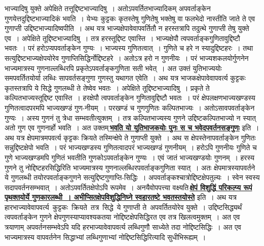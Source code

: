\documentclass[11pt, openany]{book}
\begin{document}
{{भाज्यादिषु युक्ते अपेक्षिते तत्तूद्दिष्टभाज्यादिषु~।
अतोऽपवर्तितभाज्यादिकम् अपवर्ताङ्केन गुणयेत्तदुद्दिष्टभाज्यादिकं भवति~। येभ्यः कुट्टकः कृतस्तेषु गुणितेषु भक्तेषु
वा फलभेदो नास्तीति जाते ते एव गुणाप्ती उद्दिष्टभाज्यादिष्वपीति~। अथ यत्र 
भाज्यक्षेपावेवापवर्तितौ न हरस्तत्रापि तदुत्थे गुणाप्ती तेषु युक्ते एव~।
अपेक्षिते तूद्दिष्टभाज्यादिषु~। तत्र हरस्तूद्दिष्ट एवास्ति~। भाज्यक्षेपौ
त्वपवर्ताङ्कगुणितावुद्दिष्टौ भवतः~। परं हरोऽप्यपवर्ताङ्केन गुण्यः~। भाज्यस्य
गुणितत्वात्~। 
गुणिते च हरे न स्यादुद्दिष्टहरः~। तथा सत्युद्दिष्टभाज्यक्षेपयोरेव
गुणाप्तिसिद्धिर्नोद्दिष्टहरे~। अतोऽत्र हरो न गुणनीयः~। परं भाज्यशकलयोर्गुणनेन
भाज्यमात्रस्य गुणनाल्लब्धिरपि प्रकृतेऽपवर्ताङ्कगुणिता सती भवेत्~। अत उक्तं
युतिभाज्ययोः समपवर्तितयोर्या लब्धिः सापवर्तसङ्गुणा गुणस्तु यथागत एवेति~।
अथ यत्र भाजकक्षेपावेवापवर्त्य कुट्टकः कृतस्तत्रापि ये सिद्धे गुणलब्धी ते तेष्वेव
भवतः~। 
अपेक्षिते तूद्दिष्टभाज्यादिषु~। प्रकृते ते कल्पितभाज्यस्तूद्दिष्ट
एवास्ति~। हरक्षेपौ 
त्वपवर्ताङ्केन गुणितावुद्दिष्टौ भवतः~। परं क्षेपलक्षणभाज्यखण्डस्य
गुणितत्वादपरमपि भाज्यखण्डं गुण-नीयम्~। परखण्डं च गुणगुणितः कल्पितभाज्यः~। 
अतोऽसावपवर्ताङ्केन गुण्यः~। अस्य गुणनं तु त्रेधा सम्भवतीत्युक्तम्~।
तत्र कल्पितभाज्यस्य गुणने उद्दिष्टकल्पितभाज्यो न स्यात् अतो गुण एव गुणनार्हो
भवति~। अत उक्तम्\textendash \,\hyperref[53]{\textbf{भवति यो युतिभाजकयोः पुनः स च भवेदपवर्तनसङ्गुणः}} इति~। अथ यत्र क्षेपमात्रमपवर्त्य कृट्टकः क्रियते तस्मिन्क्षेपे
ते गुणाप्ती युक्ते~। अथ स क्षेपस्तेनापवर्ताङ्केन गुणितः सन्नुद्दिष्टक्षेपो
भवति~।
\newpage
\noindent परं भाज्यखण्डस्य गुणितत्वादपरं भाज्यखण्डं गुणनीयम्~। हरोऽपि गुणनीयः 
गुणिते च गुणे भाज्यखण्डमपि गुणितं भवतीति गुणकोऽपवर्ताङ्केन गुण्यः~। 
एवं जातं भाज्यखण्डयोः गुणनम्~। हरस्य गुणने तु नोद्दिष्टहरसिद्धिरिति 
भाज्यमात्रस्य गुणनाल्लब्धिरपवर्ताङ्कगुणिता स्यात्~। अतः
क्षेपमात्रस्यापवर्तने ये गुणलब्धी तयोरपवर्ताङ्कगुणने सत्युद्दिष्टगुणाप्ति-सिद्धिः~।
अपवर्ताङ्कश्चात्रोद्दिष्टक्षेपतुल्यः~। स्वेन स्वस्य सदापवर्तनसम्भवात्~। अतोऽपवर्तितक्षेपोऽपि
रूपमेव~। अनयैवोपपत्त्या वक्ष्यति\textendash \,\hyperref[66]{\textbf{क्षेपं विशुद्धिं परिकल्प्य रूपं पृथक्तयोर्ये
गुणकारलब्धी~। अभीप्सितक्षेपविशुद्धिनिघ्ने स्वहारतष्टे भवतस्तयोस्ते}} इति~। अथ यत्र हारभाज्यावेवापवर्त्य \,कुट्टकः \,क्रियते \,तत्र \,सिद्धे \,ये गुणाप्ती ते \,अपवर्तितयोरेव युक्ते~। उद्दिष्टसिद्ध्यर्थं त्वपवर्ताङ्केन गुणने क्षेपगुणस्याप्यावश्यकतया
नोद्दिष्टक्षेपसिद्धिरत  एव तत्र खिलत्वमुक्तम्~। अत एव त्रयाणाम् अपवर्तनसम्भवेऽपि यदि हरभाज्यावेवापवर्त्य लब्धिगुणौ साध्येते तदा नोद्दिष्टसिद्धिः~। अत एव भाज्यमात्रस्य
वापवर्तनेन सिद्धाभ्यां लब्धिगुणाभ्यां नोद्दिष्टसिद्धिरित्यादि
सुधीभिरूह्यम्~। \\

}}
\end{document}

